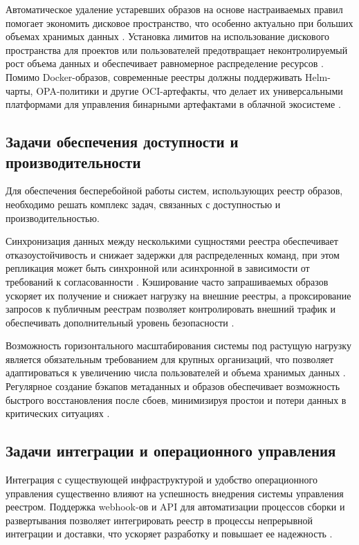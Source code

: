 Автоматическое удаление устаревших образов на основе настраиваемых правил помогает экономить дисковое пространство, что особенно актуально при больших объемах хранимых данных \cite{harbor-docs}. Установка лимитов на использование дискового пространства для проектов или пользователей предотвращает неконтролируемый рост объема данных и обеспечивает равномерное распределение ресурсов \cite{cilic2023}. Помимо Docker-образов, современные реестры должны поддерживать Helm-чарты, OPA-политики и другие OCI-артефакты, что делает их универсальными платформами для управления бинарными артефактами в облачной экосистеме \cite{cncf2022}.

\subsection{Задачи обеспечения доступности и производительности}

Для обеспечения бесперебойной работы систем, использующих реестр образов, необходимо решать комплекс задач, связанных с доступностью и производительностью.

Синхронизация данных между несколькими сущностями реестра обеспечивает отказоустойчивость и снижает задержки для распределенных команд, при этом репликация может быть синхронной или асинхронной в зависимости от требований к согласованности \cite{cilic2023}. Кэширование часто запрашиваемых образов ускоряет их получение и снижает нагрузку на внешние реестры, а проксирование запросов к публичным реестрам позволяет контролировать внешний трафик и обеспечивать дополнительный уровень безопасности \cite{harbor-docs}.

Возможность горизонтального масштабирования системы под растущую нагрузку является обязательным требованием для крупных организаций, что позволяет адаптироваться к увеличению числа пользователей и объема хранимых данных \cite{gartner2023}. Регулярное создание бэкапов метаданных и образов обеспечивает возможность быстрого восстановления после сбоев, минимизируя простои и потери данных в критических ситуациях \cite{sysdig2024}.

\subsection{Задачи интеграции и операционного управления}

Интеграция с существующей инфраструктурой и удобство операционного управления существенно влияют на успешность внедрения системы управления реестром. Поддержка webhook-ов и API для автоматизации процессов сборки и развертывания позволяет интегрировать реестр в процессы непрерывной интеграции и доставки, что ускоряет разработку и повышает ее надежность \cite{mill2020}.

